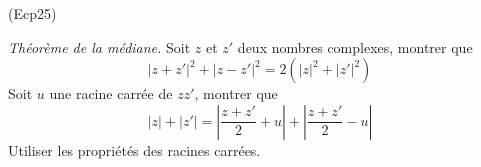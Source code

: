 \begin{tiny}(Ecp25)\end{tiny}\emph{Théorème de la médiane.}\newline
Soit $z$ et $z'$ deux nombres complexes, montrer que
\begin{displaymath}
 |z+z'|^2 + |z - z'|^2 = 2(|z|^2 + |z'|^2)
\end{displaymath}
Soit $u$ une racine carrée de $zz'$, montrer que
\begin{displaymath}
 |z|+|z'| = \left|\frac{z+z'}{2} +u\right| + \left|\frac{z+z'}{2} - u\right|
\end{displaymath}
Utiliser les propriétés des racines carrées.